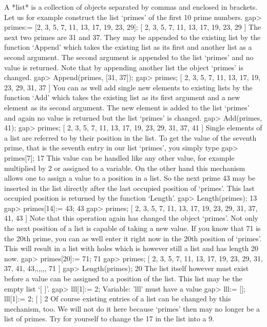 %
A *list* is a collection of objects separated by  commas and enclosed  in
brackets.  Let us for example construct the list `primes' of the first 10
prime numbers.
\beginexample
gap> primes:= [2, 3, 5, 7, 11, 13, 17, 19, 23, 29];
[ 2, 3, 5, 7, 11, 13, 17, 19, 23, 29 ]
\endexample
The next two primes are  31 and 37.  They may be appended to the existing
list by the function `Append' which takes  the existing list as its first
and another list as a second argument.  The  second argument  is appended
to the list `primes' and  no  value is returned.  Note that  by appending
another list the object `primes' is changed.
\beginexample
gap> Append(primes, [31, 37]);
gap> primes;
[ 2, 3, 5, 7, 11, 13, 17, 19, 23, 29, 31, 37 ] 
\endexample
You can as well add single new elements to existing lists by the function
`Add'  which takes  the existing list  as its  first argument  and  a new
element as  its second argument.  The  new  element  is added to the list
`primes' and again no value is returned but the list `primes' is changed.
\beginexample
gap> Add(primes, 41);
gap> primes;
[ 2, 3, 5, 7, 11, 13, 17, 19, 23, 29, 31, 37, 41 ] 
\endexample
Single elements of a list are referred to by their position in the  list.
To get the value  of the seventh prime, that is the seventh entry in  our
list `primes', you simply type
\beginexample
gap> primes[7];
17 
\endexample
This value can be handled like any other value, for example multiplied by 2
or assigned to a  variable. On the other hand  this mechanism allows one to
assign a value to  a position in  a  list. So the   next prime 43  may be
inserted  in the   list directly  after the  last   occupied position  of
`primes'. This  last occupied    position  is returned  by  the  function
`Length'.
\beginexample
gap> Length(primes);
13
gap> primes[14]:= 43;
43
gap> primes;
[ 2, 3, 5, 7, 11, 13, 17, 19, 23, 29, 31, 37, 41, 43 ] 
\endexample
Note that this operation again has changed the object `primes'.  Not only
the next position of a list is capable  of taking  a  new  value.  If you
know that 71 is the 20th prime, you can as well enter it right now in the
20th position of `primes'.   This  will result in a list with holes which
is however still a list and has length 20 now.
\beginexample
gap> primes[20]:= 71;
71
gap> primes;
[ 2, 3, 5, 7, 11, 13, 17, 19, 23, 29, 31, 37, 41, 43,,,,,, 71 ]
gap> Length(primes);
20 
\endexample
The list itself however must  exist before a  value can be  assigned to a
position of the list.  This list may be the empty list `[ ]'.
\begintt
gap> lll[1]:= 2;
Variable: 'lll' must have a value
\endtt
\beginexample
gap> lll:= []; lll[1]:= 2;
[  ]
2 
\endexample
Of course  existing entries of a list  can be  changed by this mechanism,
too. We will not do it here because `primes' then may no longer be a list
of primes. Try for yourself to change the 17 in the list into a 9.

